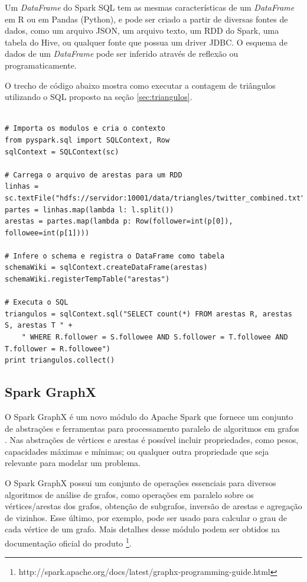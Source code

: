 Um \emph{DataFrame} do Spark SQL tem as mesmas características de um \emph{DataFrame} em R ou em 
Pandas (Python), e pode ser criado a partir de diversas fontes de dados, como um arquivo JSON, um 
arquivo texto, um RDD do Spark, uma tabela do Hive, ou qualquer fonte que possua um driver JDBC. 
O esquema de dados de um \emph{DataFrame} pode ser inferido através de reflexão ou programaticamente. 

O trecho de código abaixo mostra como executar a contagem de triângulos utilizando o SQL proposto na 
seção \ref{sec:triangulos}.


\begin{lstlisting}[style=MyPythonStyle]

# Importa os modulos e cria o contexto
from pyspark.sql import SQLContext, Row
sqlContext = SQLContext(sc)

# Carrega o arquivo de arestas para um RDD
linhas = sc.textFile("hdfs://servidor:10001/data/triangles/twitter_combined.txt")
partes = linhas.map(lambda l: l.split())
arestas = partes.map(lambda p: Row(follower=int(p[0]), followee=int(p[1])))

# Infere o schema e registra o DataFrame como tabela
schemaWiki = sqlContext.createDataFrame(arestas)
schemaWiki.registerTempTable("arestas")

# Executa o SQL
triangulos = sqlContext.sql("SELECT count(*) FROM arestas R, arestas S, arestas T " +
    " WHERE R.follower = S.followee AND S.follower = T.followee AND T.follower = R.followee")
print triangulos.collect()

\end{lstlisting}


\subsection{Spark GraphX}

O Spark GraphX é um novo módulo do Apache Spark que fornece um conjunto de abstrações e ferramentas 
para processamento paralelo de algoritmos em grafos \citep{xin2013graphx}. Nas abstrações de 
vértices e arestas é possível 
incluir propriedades, como pesos, capacidades máximas e mínimas; ou qualquer outra propriedade que 
seja relevante para modelar um problema. 

O Spark GraphX possui um conjunto de operações essenciais para diversos algoritmos de análise de grafos, 
como operações em paralelo sobre os vértices/arestas dos grafos, obtenção de subgrafos, inversão de 
arestas e agregação de vizinhos. Esse último, por exemplo, pode ser usado para calcular o grau de cada 
vértice de um grafo. Mais detalhes desse módulo podem ser obtidos na documentação oficial do produto 
\footnote{http://spark.apache.org/docs/latest/graphx-programming-guide.html}. 

